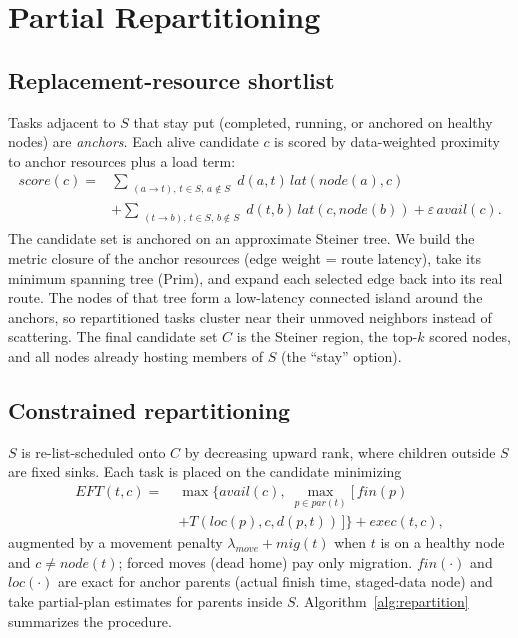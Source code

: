 \documentclass[conference]{IEEEtran}
\theoremstyle{remark}
\begin{document}
\section{Partial Repartitioning}
\label{sec:repartition}

\subsection{Replacement-resource shortlist}

Tasks adjacent to $S$ that stay put (completed, running, or anchored on
healthy nodes) are \emph{anchors}. Each alive candidate $c$ is scored by
data-weighted proximity to anchor resources plus a load term:
{\small\begin{equation*}
\begin{split}
\mathit{score}(c) =& \sum_{\substack{(a\to t),\, t\in S,\, a\notin S}}
d(a,t)\,\mathit{lat}(\mathit{node}(a),c)\\
&+ \sum_{\substack{(t\to b),\, t\in S,\, b\notin S}}
d(t,b)\,\mathit{lat}(c,\mathit{node}(b))
+ \varepsilon\,\mathit{avail}(c).
\end{split}
\end{equation*}}
The candidate set is anchored on an approximate Steiner tree. We build the
metric closure of the anchor resources (edge weight = route latency), take
its minimum spanning tree (Prim), and expand each selected edge back into
its real route. The nodes of that tree form a low-latency connected island
around the anchors, so repartitioned tasks cluster near their unmoved
neighbors instead of scattering. The final candidate set $C$ is the Steiner
region, the top-$k$ scored nodes, and all nodes already hosting members of
$S$ (the ``stay'' option).

\subsection{Constrained repartitioning}

$S$ is re-list-scheduled onto $C$ by decreasing upward rank, where children
outside $S$ are fixed sinks. Each task is placed on the candidate minimizing
\begin{equation*}
\begin{split}
\mathit{EFT}(t,c) =\;& \max\!\big\{\mathit{avail}(c),\;
  \max_{p \in \mathit{par}(t)} \big[\,\mathit{fin}(p)\\
&  + T(\mathit{loc}(p),c,d(p,t))\,\big]\big\} + \mathit{exec}(t,c),
\end{split}
\end{equation*}
augmented by a movement penalty $\lambda_{move} + \mathit{mig}(t)$ when $t$
is on a healthy node and $c \neq \mathit{node}(t)$; forced moves (dead home)
pay only migration. $\mathit{fin}(\cdot)$ and $\mathit{loc}(\cdot)$ are
exact for anchor parents (actual finish time, staged-data node) and take
partial-plan estimates for parents inside $S$.
Algorithm~\ref{alg:repartition} summarizes the procedure.
\end{document}
